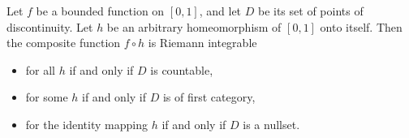 Let $f$ be a bounded function on $[0, 1]$, and let $D$ be its set of points of discontinuity. Let $h$ be an arbitrary homeomorphism of $[0, 1]$ onto itself. Then the composite function $f \circ h$ is Riemann integrable

\begin{itemize}
\item[(a)] for all $h$ if and only if $D$ is countable,
\item[(b)] for some $h$ if and only if $D$ is of first category,
\item[(c)] for the identity mapping $h$ if and only if $D$ is a nullset.
\end{itemize}
